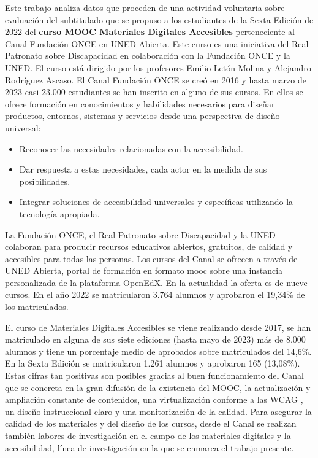 \documentclass[
  12pt,
  a4paper,
  extrafontsizes,
  onecolumn,
  openright,
  table]{memoir}
\providecommand{\tightlist}{%
  \setlength{\itemsep}{0pt}\setlength{\parskip}{0pt}}\usepackage{longtable,booktabs,array}
\begin{document}
Este trabajo analiza datos que proceden de una actividad voluntaria
sobre evaluación del subtitulado que se propuso a los estudiantes de la
Sexta Edición de 2022 del \textbf{curso MOOC Materiales Digitales
Accesibles} perteneciente al Canal Fundación ONCE en UNED Abierta. Este
curso es una iniciativa del Real Patronato sobre Discapacidad en
colaboración con la Fundación ONCE y la UNED. El curso está dirigido por
los profesores Emilio Letón Molina y Alejandro Rodríguez Ascaso. El
Canal Fundación ONCE se creó en 2016 y hasta marzo de 2023 casi 23.000
estudiantes se han inscrito en alguno de sus cursos. En ellos se ofrece
formación en conocimientos y habilidades necesarios para diseñar
productos, entornos, sistemas y servicios desde una perspectiva de
diseño universal:

\begin{itemize}
\tightlist
\item
  Reconocer las necesidades relacionadas con la accesibilidad.
\item
  Dar respuesta a estas necesidades, cada actor en la medida de sus
  posibilidades.
\item
  Integrar soluciones de accesibilidad universales y específicas
  utilizando la tecnología apropiada.
\end{itemize}

La Fundación ONCE, el Real Patronato sobre Discapacidad y la UNED
colaboran para producir recursos educativos abiertos, gratuitos, de
calidad y accesibles para todas las personas. Los cursos del Canal se
ofrecen a través de UNED \nobreak Abierta, portal de formación en
formato \gls{mooc} sobre una instancia personalizada de la plataforma
OpenEdX. En la actualidad la oferta es de nueve cursos. En el año 2022
se matricularon 3.764 alumnos y aprobaron el 19,34\% de los
matriculados.

El curso de Materiales Digitales Accesibles se viene realizando desde
2017, se han matriculado en alguna de sus siete ediciones (hasta mayo de
2023) más de 8.000 alumnos y tiene un porcentaje medio de aprobados
sobre matriculados del 14,6\%. En la Sexta Edición se matricularon 1.261
alumnos y aprobaron 165 (13,08\%). Estas cifras tan positivas son
posibles gracias al buen funcionamiento del Canal que se concreta en la
gran difusión de la existencia del MOOC, la actualización y ampliación
constante de contenidos, una virtualización conforme a las WCAG
\autocite[ver][]{WCAG21}, un diseño instruccional claro y una
monitorización de la calidad. Para asegurar la calidad de los materiales
y del diseño de los cursos, desde el Canal se realizan también labores
de investigación en el campo de los materiales digitales y la
accesibilidad, línea de investigación en la que se enmarca el trabajo
presente.
\end{document}
